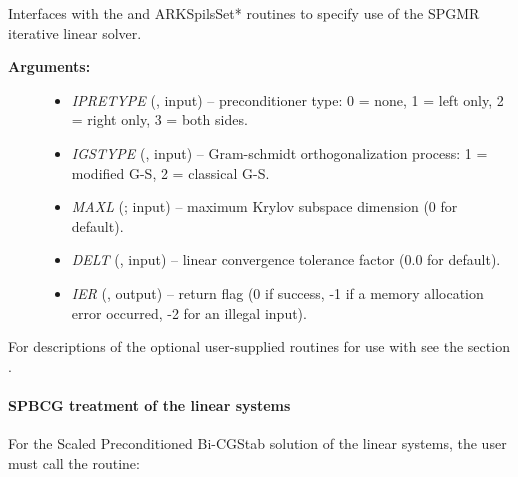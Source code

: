 \documentclass[letterpaper,10pt,english]{sphinxmanual}
\begin{document}
\begin{fulllineitems}
\label{f_interface/Usage:f/_/FARKSPGMR}
Interfaces with the {\hyperref[c_interface/User_callable:c.ARKSpgmr]{\emph{}}} and ARKSpilsSet* routines
to specify use of the SPGMR iterative linear solver.
\begin{description}
\item[{\textbf{Arguments:}}] \leavevmode\begin{itemize}
\item {} 
\emph{IPRETYPE} (, input) -- preconditioner type: 0 = none,
1 = left only, 2 = right only, 3 = both sides.

\item {} 
\emph{IGSTYPE} (, input) -- Gram-schmidt orthogonalization
process: 1 = modified G-S, 2 = classical G-S.

\item {} 
\emph{MAXL} (; input) -- maximum Krylov subspace dimension
(0 for default).

\item {} 
\emph{DELT} (, input) -- linear convergence tolerance
factor (0.0 for default).

\item {} 
\emph{IER} (, output) -- return flag (0 if success, -1 if a
memory allocation error occurred, -2 for an illegal input).

\end{itemize}

\end{description}

\end{fulllineitems}


For descriptions of the optional user-supplied routines for use with
{\hyperref[f_interface/Usage:f/_/FARKSPGMR]{\emph{}}} see the section {\hyperref[f_interface/Usage:finterface-spilsusersupplied]{\emph{}}}.


\paragraph{SPBCG treatment of the linear systems}
\label{f_interface/Usage:spbcg-treatment-of-the-linear-systems}
For the Scaled Preconditioned Bi-CGStab solution of the linear systems,
the user must call the {\hyperref[f_interface/Usage:f/_/FARKSPBCG]{\emph{}}} routine:
\end{document}
